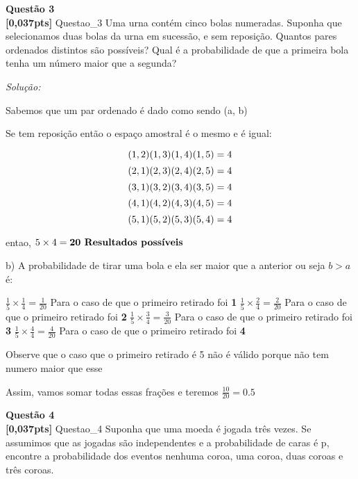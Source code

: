 \documentclass{article}
\newenvironment{problem}[2][Questão]
    { \begin{mdframed}[backgroundcolor=gray!20] \textbf{#1 #2} \\}
    {  \end{mdframed}}
\newenvironment{solution}
    {\textit{Solução:}}
    {}
\begin{document}
\begin{problem}{3}
\textbf{[0,037pts]} Questao\_3 Uma urna contém cinco bolas numeradas. Suponha que selecionamos duas bolas da urna em sucessão, e sem reposição. Quantos pares ordenados distintos são possíveis? Qual é a 
probabilidade de que a primeira bola tenha um número maior que a segunda? 

\end{problem}

\begin{solution}

Sabemos que um par ordenado é dado como sendo (a, b)

Se tem reposição então o espaço amostral é o mesmo e é igual:

\[ (1,2) (1,3) (1,4) (1,5) = 4 \newline \]
\[ (2,1) (2,3) (2,4) (2,5) = 4 \newline \]
\[ (3,1) (3,2) (3,4) (3,5) = 4 \newline \]
\[ (4,1) (4,2) (4,3) (4,5) = 4 \newline \]
\[ (5,1) (5,2) (5,3) (5,4) = 4 \newline \]

entao, $5 \times 4 = \textbf{20 Resultados possíveis} \newline$


b) A probabilidade de tirar uma bola e ela ser maior que a anterior ou seja $b>a$ é: \newline

$\frac{1}{5} \times \frac{1}{4} = \frac{1}{20}$ Para o caso de que o primeiro retirado foi \textbf{1}\newline
$\frac{1}{5} \times \frac{2}{4} = \frac{2}{20}$ Para o caso de que o primeiro retirado foi \textbf{2}\newline
$\frac{1}{5} \times \frac{3}{4} = \frac{3}{20}$ Para o caso de que o primeiro retirado foi \textbf{3}\newline
$\frac{1}{5} \times \frac{4}{4} = \frac{4}{20}$ Para o caso de que o primeiro retirado foi \textbf{4}\newline

Observe que o caso que o primeiro retirado é 5 não é válido porque não tem numero maior que esse\newline

Assim, vamos somar todas essas frações e teremos $\frac{10}{20} = 0.5$
\end{solution}

\begin{problem}{4}
\textbf{[0,037pts]} Questao\_4 Suponha que uma moeda é jogada três vezes. Se assumimos que as jogadas são independentes e a probabilidade de caras é p, encontre a probabilidade dos eventos nenhuma coroa, uma coroa, duas coroas e três coroas. 

\end{problem}
\end{document}
